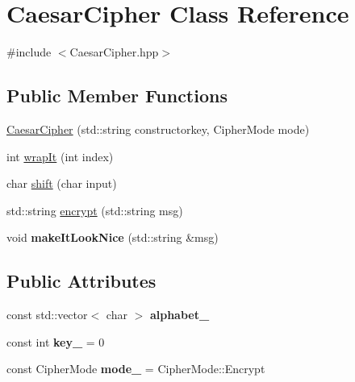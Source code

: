 \hypertarget{class_caesar_cipher}{\section{Caesar\-Cipher Class Reference}
\label{class_caesar_cipher}
}


{\ttfamily \#include $<$Caesar\-Cipher.\-hpp$>$}

\subsection*{Public Member Functions}
\begin{DoxyCompactItemize}
\item 
\hyperlink{class_caesar_cipher_aac0c030f098c6aef23d3a6b596aaf4aa}{Caesar\-Cipher} (std\-::string constructorkey, Cipher\-Mode mode)
\item 
int \hyperlink{class_caesar_cipher_a53b507960879e111df84de87da4bd1fd}{wrap\-It} (int index)
\item 
char \hyperlink{class_caesar_cipher_a60e50b9f5b32756b44d986fe1901eacb}{shift} (char input)
\item 
std\-::string \hyperlink{class_caesar_cipher_a7990118b655a6001aaf34824de9241e7}{encrypt} (std\-::string msg)
\item 
\hypertarget{class_caesar_cipher_a85dc304c1762e6e86ac5b1d0193d1ac7}{void {\bfseries make\-It\-Look\-Nice} (std\-::string \&msg)}\label{class_caesar_cipher_a85dc304c1762e6e86ac5b1d0193d1ac7}

\end{DoxyCompactItemize}
\subsection*{Public Attributes}
\begin{DoxyCompactItemize}
\item 
\hypertarget{class_caesar_cipher_ac515c66e4c5b0e01205d32a5e33bf77e}{const std\-::vector$<$ char $>$ {\bfseries alphabet\-\_\-}}\label{class_caesar_cipher_ac515c66e4c5b0e01205d32a5e33bf77e}

\item 
\hypertarget{class_caesar_cipher_afd4c56635dd54fe2b4b503362ce99abc}{const int {\bfseries key\-\_\-} = 0}\label{class_caesar_cipher_afd4c56635dd54fe2b4b503362ce99abc}

\item 
\hypertarget{class_caesar_cipher_a6258687dec40287b19bc1ffe1a305975}{const Cipher\-Mode {\bfseries mode\-\_\-} = Cipher\-Mode\-::\-Encrypt}\label{class_caesar_cipher_a6258687dec40287b19bc1ffe1a305975}

\end{DoxyCompactItemize}


